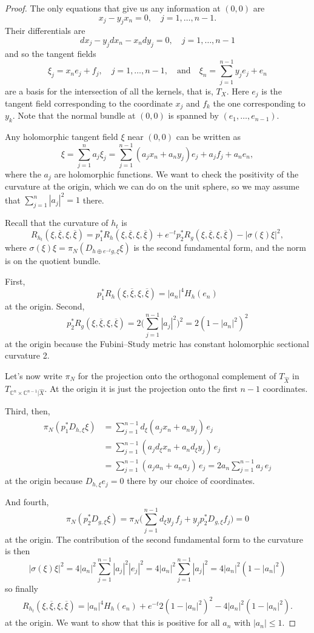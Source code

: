\documentclass[10pt,a4paper]{amsart}
\newcommand{\kk}[1]{\mathbb{#1}}
\def\qandq{\quad\text{and}\quad}
\def\ov#1{\overline{#1}}
\def\hsc{holomorphic sectional curvature}
\def\bl#1{\widehat{#1}}
\def\blX{\bl{X}}
\begin{document}
\begin{proof}
The only equations that give us any information at $(0,0)$ are
$$
x_j - y_j x_n = 0, \quad j = 1, \ldots, n-1.
$$
Their differentials are
$$
dx_j - y_j dx_n - x_n dy_j = 0, \quad j=1,\ldots,n-1
$$
and so the tangent fields
$$
\xi_j = x_n e_j + f_j,
\quad j=1,\ldots,n-1,
\qandq
\xi_n = \sum_{j=1}^{n-1} y_j e_j + e_n
$$
are a basis for
the intersection of all the kernels, that is, $T_X$.
Here $e_j$ is the tangent field corresponding to the coordinate $x_j$
and $f_k$ the one corresponding to $y_k$.
Note that the normal bundle at $(0,0)$ is spanned by $(e_1, \ldots, e_{n-1})$.

Any holomorphic tangent field $\xi$ near $(0,0)$ can be written as
$$
\xi = \sum_{j=1}^n a_j \xi_j
= \sum_{j=1}^{n-1} (a_j x_n + a_n y_j) e_j + a_j f_j
+ a_n e_n,
$$
where the $a_j$ are holomorphic functions.
We want to check the positivity of the curvature at the origin, which we can do
on the unit sphere, so we may assume that $\sum_{j=1}^n |a_j|^2 = 1$ there.

Recall that the curvature of $h_t$ is
$$
R_{h_t}(\xi, \ov\xi, \xi, \ov\xi)
= p_1^* R_h(\xi, \ov\xi, \xi, \ov\xi)
+ e^{-t} p_2^* R_g(\xi, \ov\xi, \xi, \ov\xi)
- |\sigma(\xi)\xi|^2,
$$
where $\sigma(\xi)\xi = \pi_N(D_{h \oplus e^{-t} g,\xi} \xi)$ is the second
fundamental form, and the norm is on the quotient bundle.

First,
$$
p_1^*R_h(\xi, \ov\xi, \xi, \ov\xi)
= |a_n|^4 H_h(e_n)
$$
at the origin. Second,
$$
p_2^*R_g(\xi, \ov\xi, \xi, \ov\xi)
= 2 \biggl(\sum_{j=1}^{n-1} |a_j|^2\biggr)^2
= 2(1 - |a_n|^2)^2
$$
at the origin
because the Fubini--Study metric has constant \hsc{} 2.

Let's now write $\pi_N$ for the projection onto the orthogonal complement of
$T_{\blX}$ in $T_{\kk C^n \times \kk C^{n-1}|\blX}$.
At the origin it is just the projection onto the first $n-1$ coordinates.

Third, then,
\begin{align*}
\pi_N(p_1^*D_{h,\xi} \xi)
&= \sum_{j=1}^{n-1} d_{\xi}(a_j x_n + a_n y_j) \, e_j
\\
&= \sum_{j=1}^{n-1} (a_j d_{\xi}x_n + a_n d_{\xi} y_j) \, e_j
\\
&= \sum_{j=1}^{n-1} (a_j a_n + a_n a_j ) \, e_j
= 2 a_n \sum_{j=1}^{n-1} a_j \, e_j
\end{align*}
at the origin
because $D_{h,\xi} e_j = 0$ there by our choice of coordinates.

And fourth,
$$
\pi_N(p_2^*D_{g,\xi} \xi)
= \pi_N \biggl( \sum_{j=1}^{n-1} d_\xi y_j \, f_j + y_j p_2^*D_{g,\xi} f_j \biggr) = 0
$$
at the origin.
The contribution of the second fundamental form to the curvature is then
$$
|\sigma(\xi)\xi|^2
= 4 |a_n|^2 \sum_{j=1}^{n-1} |a_j|^2 |e_j|^2
= 4 |a_n|^2 \sum_{j=1}^{n-1} |a_j|^2
= 4 |a_n|^2(1 - |a_n|^2)
$$
so finally
\begin{align*}
R_{h_t}(\xi, \ov\xi, \xi, \ov\xi)
= |a_n|^4 H_h(e_n)
+ e^{-t} 2(1 - |a_n|^2)^2
- 4 |a_n|^2(1 - |a_n|^2).
\end{align*}
at the origin.
We want to show that this is positive for all $a_n$ with $|a_n| \leq 1$.


\end{proof}
\end{document}
